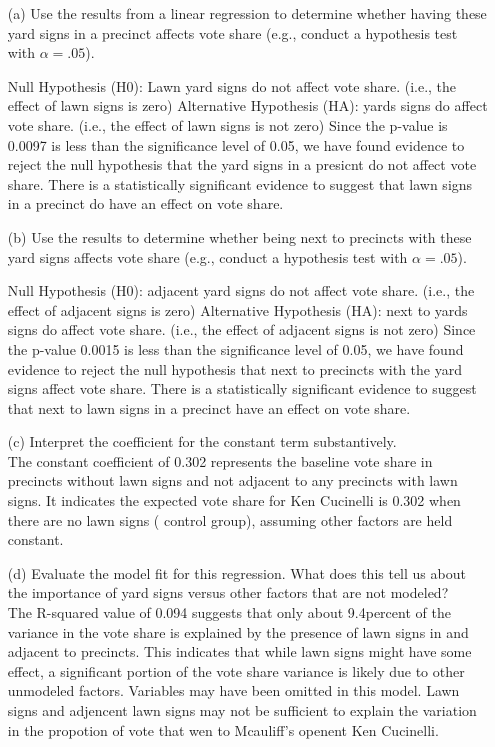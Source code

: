 \documentclass[12pt,letterpaper]{article}
\begin{document}
\vspace{.5cm}
\begin{enumerate}
	\item [(a)] Use the results from a linear regression to determine whether having these yard signs in a precinct affects vote share (e.g., conduct a hypothesis test with $\alpha = .05$).
  	
Null Hypothesis (H0): Lawn  yard signs do not affect vote share. (i.e., the effect of lawn signs is zero)
Alternative Hypothesis (HA): yards signs do affect vote share. (i.e., the effect of lawn signs is not zero)
Since the p-value is 0.0097  is less than the significance level of 0.05, we have found evidence to reject the null hypothesis that the yard signs in a presicnt do not affect vote share. There is  a statistically significant evidence to suggest that lawn signs in a precinct do have an effect on vote share.


	\item [(b)]  Use the results to determine whether being
	next to precincts with these yard signs affects vote
	share (e.g., conduct a hypothesis test with $\alpha = .05$).
  	
Null Hypothesis (H0): adjacent  yard signs do not affect vote share. (i.e., the effect of adjacent signs is zero)
Alternative Hypothesis (HA): next to yards signs do affect vote share. (i.e., the effect of adjacent signs is not zero)
Since the p-value  0.0015 is less than the significance level of 0.05, we have found evidence to reject the null hypothesis that next to precincts with the yard signs affect vote share. There is  a statistically significant evidence to suggest that next to  lawn signs in a precinct have an effect on vote share.

	\item [(c)] Interpret the coefficient for the constant term substantively.\\
\noindent The constant coefficient of 0.302 represents the baseline vote share in precincts without lawn signs and not adjacent to any precincts with lawn signs. It indicates the expected vote share for Ken Cucinelli is 0.302 when there are no lawn signs ( control group), assuming other factors are held constant.
	
	\item [(d)] Evaluate the model fit for this regression.  What does this	tell us about the importance of yard signs versus other factors that are not modeled?\\
\noindent The R-squared value of 0.094 suggests that only about 9.4percent of the variance in the vote share is explained by the presence of lawn signs in and adjacent to precincts. This indicates that while lawn signs might have some effect, a significant portion of the vote share variance is likely due to other unmodeled factors. Variables may have been omitted in this model.  Lawn signs and adjencent lawn signs may not be sufficient to explain the variation in the propotion of vote that wen to Mcauliff's openent Ken Cucinelli. 
	
\end{enumerate}  
\end{document}
